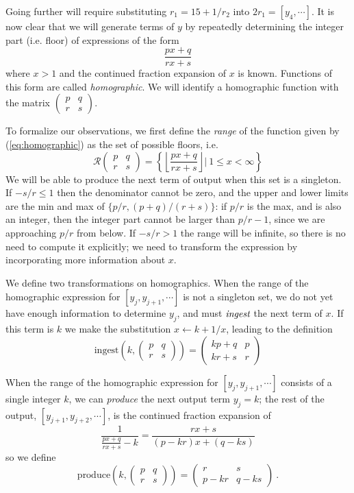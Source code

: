 \documentclass[11pt, oneside]{amsart}   	%
\newcommand{\pqrs}{\left(
\begin{smallmatrix} 
p & q\\ 
r & s 
\end{smallmatrix}
\right)}
\newcommand{\homographic}[4]{\begin{pmatrix} #1 & #2\\ #3 & #4 \end{pmatrix}}
\begin{document}
Going further will require substituting $r_1 = 15+1/r_2$ into $2r_1 = [y_4,\cdots]$.
It is now clear that we will generate terms of $y$ by repeatedly determining the integer part (i.e. floor) of expressions of the form
\begin{equation}\label{eq:homographic}
\frac{px+q}{rx+s}
\end{equation}
where $x>1$ and the continued fraction expansion of $x$ is known. Functions of this form are called \emph{homographic}.
We will identify a homographic function with the matrix
$\left(
\begin{smallmatrix} 
p & q\\ 
r & s 
\end{smallmatrix}
\right)$.

To formalize our observations, we first define the \emph{range} of the function given by (\ref{eq:homographic}) as the set of possible floors, i.e.
\begin{equation}
\mathcal{R}\pqrs = \left\{ \left\lfloor \frac{px+q}{rx+s} \right\rfloor | \  1 \leq x < \infty \right\}
\end{equation}
We will be able to produce the next term of output when this set is a singleton. If $-s/r \leq 1$ then the denominator cannot be zero, and the upper and lower limits are the min and max of $\{p/r, (p+q)/(r+s)\}$: if $p/r$ is the max, and is also an integer, then the integer part cannot be larger than $p/r-1$, since we are approaching $p/r$ from below. If  $-s/r > 1$ the range will be infinite, so there is no need to compute it explicitly; we need to transform the expression by incorporating more information about $x$.

We define two transformations on homographics. When the range of the homographic expression for $[y_j,y_{j+1},\cdots]$ is not a singleton set, we do not yet have enough information to determine $y_j$, and must $\emph{ingest}$ the next term of $x$. If this term is $k$ we make the substitution $x \leftarrow k + 1/x$, leading to the definition
\begin{equation}
\mbox{ingest}(k,\pqrs) = \homographic{kp+q}{p}{kr+s}{r}%
\end{equation}


When the range of the homographic expression for $[y_j,y_{j+1},\cdots]$ consists of a single integer $k$, we can \emph{produce}  the next output term $y_j = k$; the rest of the output, $[y_{j+1},y_{j+2},\cdots]$, is the continued fraction expansion of
\[
\frac{1}{\frac{px+q}{rx+s}-k} = \frac{rx+s}{(p-kr)x + (q-ks)}
\] 
so we define 
\begin{equation}
\mbox{produce}(k,\pqrs) = \homographic{r}{s}{p-kr}{q-ks}\ .
\end{equation}
\end{document}
